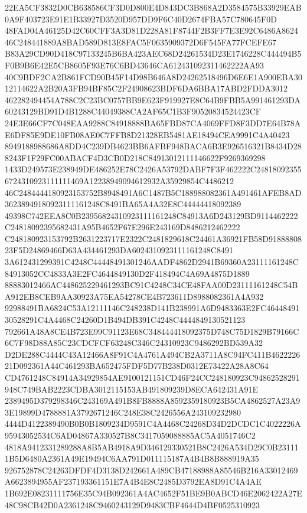 \documentclass[UTF8,fontset=fandol,zihao=-4,a4paper]{ctexart}
\begin{document}
{{22EA5CF3832D0CB638586CF3D0D800E4D843DC3B868A2D3584575B33929EAB0A9F403723E91E1B33927D3520D957DD9F6C40D2674FBA57C780645F0D
48FAD04A46125D42C60CFF3A3D81D228A81F8744F2B3FF7E3E92C6486A862446C248441889A8BAD589D813E8FAC5F0635909372D6F545FA77FCEFE67
B83A29CD90D418C97133245B6BA423AEC68D24261534D23E1746228C444494B5F0B9B6E42E5CB8605F93E76C6BD43646CA612431092311462222AA93
40C9BDF2CA2B861FCD90B45F14D98B646A8D24262518496D6E6E1A900EBA3012114622A2B20A3FB94BF85C2F24908623BDF6DA6BBA17ABD2FDDA3012
462282494454A788C2C23BC0757BB9E623F919927E8C64B9FBB5A991461293DA60243129BD91D4B1288C44049388CA2AF65C1B3F90520834524423CF
24E3E66CF7C048EAA9288C84918888BA65FBD87CA4069FFD8F3DD7E64B78AE6DF85E9DE10FB08AE0C7FFB8D21328EB5481AE18494CEA9991C4A40423
8949188988686A8DD4C239DB4623BB6AFBF948BACA6B3E926516321B8434D288243F1F29FC00ABACF4D3CB0D218C84913012111146622F9269369298
1433D249573E238949DE486252E78C2426A53792DABF7F3F462222C248180923556724310923111111469A12238949094612932A35929854C4486212
46C2484444180923153752B8948491A6C1487B5C188988082361A491461AFEB8AD36238949180923111161248C8491BA65A4A32E8C44444418092389
49398C742EEA8C0B23956824310923111161248C84913A6D243129BD9114462222C24818092395682431A95B4652F67E296E243169D8486212462222
C248180923153792B2631223717E2322C2481829618C24461A36921FB58D9188880823F5D24869466D63A434461293DA6024310923111161248C8491
3A612431299391C4248C44448491301246AADF4862D2941B69360A23111161248C84913052CC4833A3E2FC4644849130D2F418494C4A69A4875D1889
88883012466AC448625229461293BC91C4248C34CE48FAA00D23111161248C54BA912EB8CEB9AA30923A75EA54278CE4B723611D8988082361A4A932
92988491BA6824C53A12111146C248238D141B238991A6D9483363E2FC4644849130528291C4A4468C24260D1B494DB391C4248C4444849130521123
792661A48A8CE4B723E99C91123E68C348444418092375D748C75D1829B79166C6C7F98D88A85C23CDCFCF63248C346C24310923C9486292BD539A32
D2DE288C4444C43A12466A8F91C4A4761A494CB2A3711A8C94FC411B462222621D092361A44C461293BA652475FDF5D77B238D0312E73422A28A8C64
CD4761248C84914A34929854AE9100121151CD46F24CC248180923C94862528291948C749BAB2223CDBA3012115153AB491809239D8ECA642431A91E
2389495D379298346C243169A491B8FB8888A8592359180923B5CA4862527A23A93E19899D4788881A3792671246C248E38C2426556A243109232980
4444D4122389490B0B0B1809234D9591C4A4468C24268D34D2DCDC1C4022226A95943052534C6AD04867A330527B8C3417059088885AC5A4051746C2
4818A9412331289288A8B5AB4918A9D346129330521B8C2426A534D29C0B231111B5D6480A2361A49E19494C6AA791D011115187A4B4B8B888919A35
926752878C24263DFDF4D3138D242661A489CB47188988A85546B216A33012469A6623894955AF237193361151E7A4B4E8C2485D3792EA8D91C4A4AE
1B692E08231111756E35C94B092361A4AC4652F51BE9B0ABCD46E2062422A27E48C98CB42D0A2361248C9460243129D9483CBF4644D4BF0525310923
}}
\end{document}
